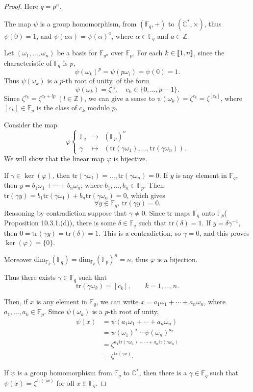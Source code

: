 \documentclass[11pt,a4paper]{article}
\def\gcro{\mbox{[\hspace{-.15em}[}}%
\def\dcro{\mbox{]\hspace{-.15em}]}}
\newcommand{\Z}{\mathbb{Z}}
\newcommand{\C}{\mathbb{C}}
\newcommand{\F}{\mathbb{F}}
\begin{document}
\begin{proof} Here $q = p^n$. 

The map $\psi$ is a group homomorphism, from $(\F_q,+)$ to $(\C^*,\times)$, thus $\psi(0) = 1$, and $\psi(a \alpha) = \psi(\alpha)^a$, where $\alpha \in \F_q$ and $a \in \Z$.

Let $(\omega_1,\ldots,\omega_n)$ be a basis for $\F_{p^n}$ over $\F_p$. For each $k \in \gcro 1,n\dcro$, since the characteristic of $\F_{q}$ is $p$,
$$\psi(\omega_k)^p = \psi( p \omega_i) = \psi(0) = 1.$$
Thus $\psi(\omega_k)$ is a $p$-th root of unity, of the form
$$\psi(\omega_k) = \zeta^{c_k}, \quad c_k \in \{0, \ldots, p-1\}.$$
Since $\zeta^{c_k} = \zeta^{c_k + lp} \ (l\in \Z)$, we can give a sense to $\psi(\omega_k) = \zeta^{c_k} = \zeta^{[c_k]}$, where $[c_k] \in \F_p$ is the class of $c_k$ modulo $p$.

Consider the map
$$
\varphi
\left\{
\begin{array}{ccl}
\F_q & \to & (\F_p)^n\\
\gamma & \mapsto & (\mathrm{tr}(\gamma \omega_1),\ldots, \mathrm{tr}(\gamma \omega_n)).
\end{array}
\right.
$$
We will show that the linear map $\varphi$ is bijective.

If $\gamma \in \ker(\varphi)$, then $\mathrm{tr}(\gamma \omega_1) = \ldots, \mathrm{tr}(\gamma \omega_n) = 0$. If $y$ is any element in $\F_q$, then $y = b_1 \omega_1+\cdots + b_n \omega_n$, where $b_1,\ldots, b_n \in \F_p$. Then  $\mathrm{tr}(\gamma y) = b_1 \mathrm{tr}(\gamma \omega_1) + b_n \mathrm{tr}(\gamma \omega_n) = 0$, which gives
$$\forall y \in \F_q,\ \mathrm{tr}(\gamma y ) = 0.$$ 
Reasoning by contradiction suppose that $\gamma \ne 0$. Since $\mathrm{tr}$ maps $\F_q$ onto $\F_p$( Proposition 10.3.1.(d)), there is some $\delta \in \F_q$ such that $\mathrm{tr}(\delta) = 1$. If $y = \delta \gamma^{-1}$, then $0 = \mathrm{tr}(\gamma y) = \mathrm{tr}(\delta) = 1$. This is a contradiction, so $\gamma = 0$, and this proves $\ker(\varphi) = \{0\}$.

Moreover $\mathrm{dim}_{\F_p} (\F_q) = \mathrm{dim}_{\F_p}(\F_p)^n = n$, thus $\varphi$ is a bijection.

Thus there exists $\gamma \in \F_q$ such that $$\mathrm{tr}(\gamma \omega_k) = [c_k],\qquad k=1,\ldots,n.$$

Then, if $x$ is any element in $\F_q$, we can write $x = a_1 \omega_1 + \cdots + a_n \omega_n$, where $a_1,\ldots,a_k \in \F_p$. Since $\psi(\omega_k)$ is a $p$-th root of unity,
\begin{align*}
\psi(x) &= \psi( a_1 \omega_1 + \cdots + a_n \omega_n)\\
&=\psi(\omega_1)^{a_1} \cdots \psi(\omega_n)^{a_n}\\
&=\zeta^{a_1 \mathrm{tr}(\gamma \omega_1) + \cdots + a_n \mathrm{tr}(\gamma\omega_n)}\\
&=\zeta^{\mathrm{tr}(\gamma x)}.
\end{align*}

If $\psi$ is a group homomorphism from $\F_q$ to $\C^*$, then there is a $\gamma \in \F_q$ such that $\psi(x) = \zeta^{\mathrm{tr}(\gamma x)}$ for all $x \in \F_q$.
\end{proof}
\end{document}
